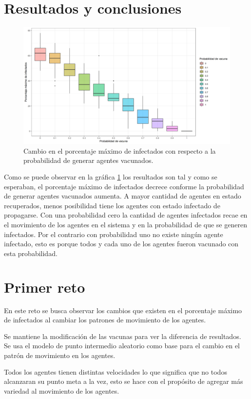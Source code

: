 \documentclass{article}
\begin{document}
\section{Resultados y conclusiones}

\begin{figure}[H]
\centering
\includegraphics[width = 187 mm]{Graficap6.png}
\caption{Cambio en el porcentaje máximo de infectados con respecto a la probabilidad de generar agentes vacunados.}
\label{g1}
\end{figure}
Como se puede observar en la gráfica \ref{g1} los resultados son tal y como se esperaban, el porcentaje máximo de infectados decrece conforme la probabilidad de generar agentes vacunados aumenta.
A mayor cantidad de agentes en estado recuperados, menos posibilidad tiene los agentes con estado infectado de propagarse. 
Con una probabilidad cero la cantidad de agentes infectados recae en el movimiento de los agentes en el sistema y en la probabilidad de que se generen infectados.
Por el contrario con probabilidad uno no existe ningún agente infectado, esto es porque todos y cada uno de los agentes fueron vacunado con esta probabilidad.

\section{Primer reto}
En este reto se busca observar los cambios que existen en el porcentaje máximo de infectados al cambiar los patrones de movimiento de los agentes.

Se mantiene la modificación de las vacunas para ver la diferencia de resultados.
Se usa el modelo de punto intermedio aleatorio como base para el cambio en el patrón de movimiento en los agentes. 

Todos los agentes tienen distintas velocidades lo que significa que no todos alcanzaran su punto meta a la vez, esto se hace con el propósito de agregar más variedad al movimiento de los agentes.
\end{document}
